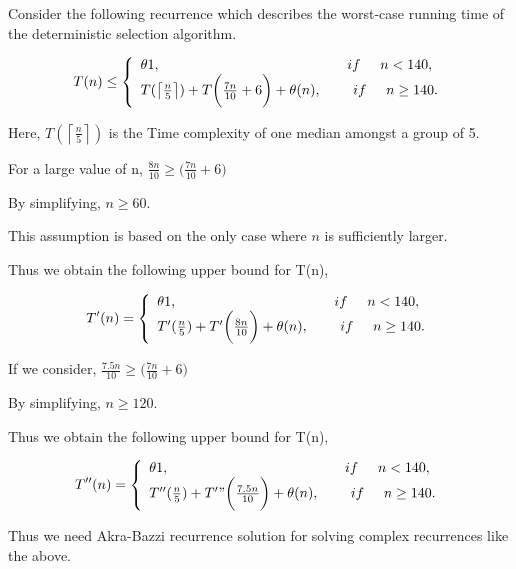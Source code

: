 \documentclass[11pt]{article}
\newcommand{\ceil}[1]{\ensuremath{\left\lceil#1\right\rceil}}
\newcommand{\T}{\hspace{0.5cm}}
\begin{document}
Consider the following recurrence which describes the worst-case running time of the deterministic selection algorithm.

	 $$
	T(n) \leq  \left\{
        \begin{array}{ll}
        		\theta{1}, & \quad if \T n < 140 , \\
            T(\ceil{\frac{n}{5}}) + T \biggl(\frac{7n}{10} + 6 \biggr) + \theta(n) , &  \T if\T n \geq 140.
        \end{array}
    \right.     
	$$

Here, $T(\ceil{\frac{n}{5}})$ is the Time complexity of one median amongst a group of 5. 

For a large value of n,
$\frac{8n}{10} \geq \biggl(\frac{7n}{10} + 6 \biggr) $ 

By simplifying, $ n \geq 60 $.

This assumption is based on the only case where $n$ is sufficiently larger.

Thus we obtain the following upper bound for T(n), 

	 $$
	T'(n) =  \left\{
        \begin{array}{ll}
        		\theta{1}, & \quad if \T n < 140 , \\
            T'({\frac{n}{5}}) + T' \biggl(\frac{8n}{10} \biggr) + \theta(n) , &  \T if\T n \geq 140.
        \end{array}
    \right.     
	$$
    
If we consider, $\frac{7.5n}{10} \geq \biggl(\frac{7n}{10} + 6 \biggr) $ 

By simplifying, $ n \geq 120 $.
    
Thus we obtain the following upper bound for T(n), 

	 $$
	T''(n) =  \left\{
        \begin{array}{ll}
        		\theta{1}, & \quad if \T n < 140 , \\
            T''({\frac{n}{5}}) + T'" \biggl(\frac{7.5n}{10} \biggr) + \theta(n) , &  \T if\T n \geq 140.
        \end{array}
    \right.     
	$$    
    
Thus we need Akra-Bazzi recurrence solution for solving complex recurrences like the above.

\clearpage
\end{document}
